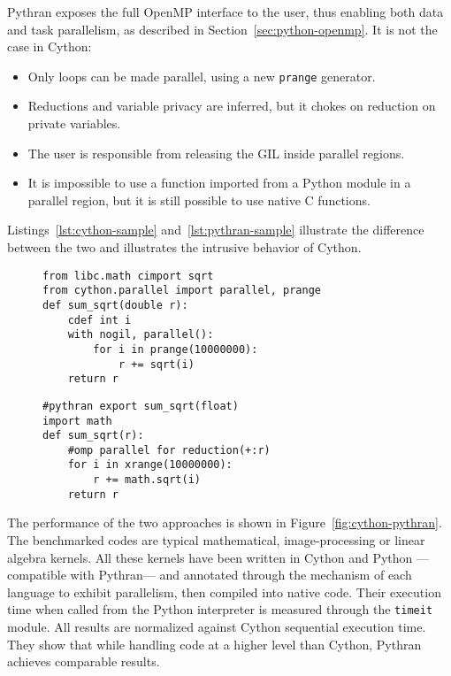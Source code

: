 \documentclass[conference]{IEEEtran}
\begin{document}
Pythran exposes the full OpenMP interface to the user, thus enabling both data
and task parallelism, as described in Section~\ref{sec:python-openmp}. It is
not the case in Cython:
%
\begin{itemize}

    \item Only loops can be made parallel, using a new \texttt{prange} generator.

    \item Reductions and variable privacy are inferred, but it chokes on
        reduction on private variables.

    \item The user is responsible from releasing the GIL inside parallel
        regions.

    \item It is impossible to use a function imported from a Python module in a
        parallel region, but it is still possible to use native C functions.

\end{itemize}
%
Listings~\ref{lst:cython-sample} and~\ref{lst:pythran-sample} illustrate the
difference between the two and illustrates the intrusive behavior of Cython.

\begin{figure}

    \begin{lstlisting}[label={lst:cython-sample}, caption={Cython implementation
    of a parallel reduction.}]
from libc.math cimport sqrt
from cython.parallel import parallel, prange
def sum_sqrt(double r):
    cdef int i
    with nogil, parallel():
        for i in prange(10000000):
            r += sqrt(i)
    return r
    \end{lstlisting}
%
    \begin{lstlisting}[label={lst:pythran-sample}, caption={Pythran implementation
    of a parallel reduction.}]
#pythran export sum_sqrt(float)
import math
def sum_sqrt(r):
    #omp parallel for reduction(+:r)
    for i in xrange(10000000):
        r += math.sqrt(i)
    return r
    \end{lstlisting}
\end{figure}

The performance of the two approaches is shown in
Figure~\ref{fig:cython-pythran}.  The benchmarked codes are typical
mathematical, image-processing or linear algebra kernels. All these kernels have
been written in Cython and Python ---compatible with Pythran--- and annotated
through the mechanism of each language to exhibit parallelism, then compiled
into native code.  Their execution time when called from the Python interpreter
is measured through the \texttt{timeit} module. All results are normalized
against Cython sequential execution time. They show that while handling code at
a higher level than Cython, Pythran achieves comparable results.
\end{document}
